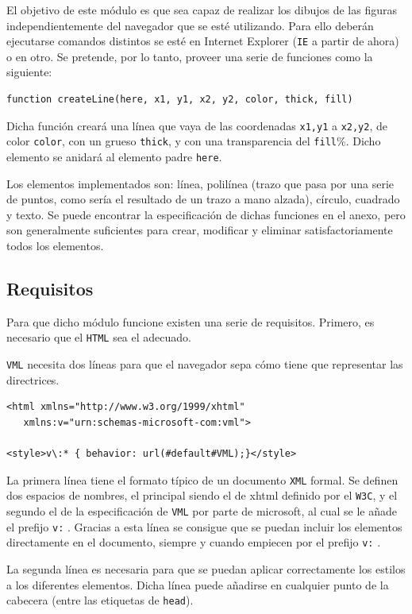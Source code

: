 El objetivo de este módulo es que sea capaz de realizar los dibujos de las figuras independientemente del navegador que se esté utilizando. Para ello deberán ejecutarse comandos distintos se esté en Internet Explorer (\texttt{IE} a partir de ahora) o en otro. Se pretende, por lo tanto, proveer una serie de funciones como la siguiente:

\begin{verbatim}
function createLine(here, x1, y1, x2, y2, color, thick, fill)
\end{verbatim}

Dicha función creará una línea que vaya de las coordenadas \texttt{x1,y1} a \texttt{x2,y2}, de color \texttt{color}, con un grueso \texttt{thick}, y con una transparencia del \texttt{fill}\%. Dicho elemento se anidará al elemento padre \texttt{here}.

Los elementos implementados son: línea, polilínea (trazo que pasa por una serie de puntos, como sería el resultado de un trazo a mano alzada), círculo, cuadrado y texto. Se puede encontrar la especificación de dichas funciones en el anexo, pero son generalmente suficientes para crear, modificar y eliminar satisfactoriamente todos los elementos.

\subsection{Requisitos}
Para que dicho módulo funcione existen una serie de requisitos. Primero, es necesario que el \texttt{HTML} sea el adecuado.

\texttt{VML} necesita dos líneas para que el navegador sepa cómo tiene que representar las directrices.
\begin{verbatim}
<html xmlns="http://www.w3.org/1999/xhtml" 
   xmlns:v="urn:schemas-microsoft-com:vml">

<style>v\:* { behavior: url(#default#VML);}</style>
\end{verbatim}

La primera línea tiene el formato típico de un documento \texttt{XML} formal. Se definen dos espacios de nombres, el principal siendo el de xhtml definido por el \texttt{W3C}, y el segundo el de la especificación de \texttt{VML} por parte de microsoft, al cual se le añade el prefijo \texttt{v:} . Gracias a esta línea se consigue que se puedan incluir los elementos directamente en el documento, siempre y cuando empiecen por el prefijo \texttt{v:} .

La segunda línea es necesaria para que se puedan aplicar correctamente los estilos a los diferentes elementos. Dicha línea puede añadirse en cualquier punto de la cabecera (entre las etiquetas de \texttt{head}).

